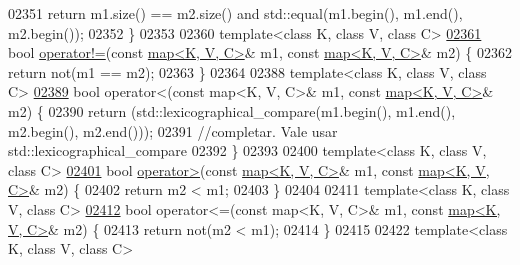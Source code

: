 \begin{DoxyCode}
02351     \textcolor{keywordflow}{return} m1.size() == m2.size() and std::equal(m1.begin(), m1.end(), m2.begin());
02352 \}
02353 
02360 \textcolor{keyword}{template}<\textcolor{keyword}{class} K, \textcolor{keyword}{class} V, \textcolor{keyword}{class} C>
\hyperlink{classaed2_1_1map_abce0fa35c5b25fd67111c2e704616f09_abce0fa35c5b25fd67111c2e704616f09}{02361} \textcolor{keywordtype}{bool} \hyperlink{classaed2_1_1map_abce0fa35c5b25fd67111c2e704616f09_abce0fa35c5b25fd67111c2e704616f09}{operator!=}(\textcolor{keyword}{const} \hyperlink{classaed2_1_1map}{map<K, V, C>}& m1, \textcolor{keyword}{const} \hyperlink{classaed2_1_1map}{map<K, V, C>}& m2) \{
02362     \textcolor{keywordflow}{return} not(m1 == m2);
02363 \}
02364 
02388 \textcolor{keyword}{template}<\textcolor{keyword}{class} K, \textcolor{keyword}{class} V, \textcolor{keyword}{class} C>
\hyperlink{classaed2_1_1map_a8ff07f6a24c290ea7e8f63ec7ab24f8d_a8ff07f6a24c290ea7e8f63ec7ab24f8d}{02389} \textcolor{keywordtype}{bool} operator<(const map<K, V, C>& m1, \textcolor{keyword}{const} \hyperlink{classaed2_1_1map}{map<K, V, C>}& m2) \{
02390     \textcolor{keywordflow}{return} (std::lexicographical\_compare(m1.begin(), m1.end(), m2.begin(), m2.end()));
02391     \textcolor{comment}{//completar.  Vale usar std::lexicographical\_compare}
02392 \}
02393 
02400 \textcolor{keyword}{template}<\textcolor{keyword}{class} K, \textcolor{keyword}{class} V, \textcolor{keyword}{class} C>
\hyperlink{classaed2_1_1map_a2000cd874b72034ce7fe730c811b6c63_a2000cd874b72034ce7fe730c811b6c63}{02401} \textcolor{keywordtype}{bool} \hyperlink{classaed2_1_1map_a2000cd874b72034ce7fe730c811b6c63_a2000cd874b72034ce7fe730c811b6c63}{operator>}(\textcolor{keyword}{const} \hyperlink{classaed2_1_1map}{map<K, V, C>}& m1, \textcolor{keyword}{const} \hyperlink{classaed2_1_1map}{map<K, V, C>}& m2) \{
02402     \textcolor{keywordflow}{return} m2 < m1;
02403 \}
02404 
02411 \textcolor{keyword}{template}<\textcolor{keyword}{class} K, \textcolor{keyword}{class} V, \textcolor{keyword}{class} C>
\hyperlink{classaed2_1_1map_afe374b37f17263d0cad3ee19a590d208_afe374b37f17263d0cad3ee19a590d208}{02412} \textcolor{keywordtype}{bool} operator<=(const map<K, V, C>& m1, \textcolor{keyword}{const} \hyperlink{classaed2_1_1map}{map<K, V, C>}& m2) \{
02413     \textcolor{keywordflow}{return} not(m2 < m1);
02414 \}
02415 
02422 \textcolor{keyword}{template}<\textcolor{keyword}{class} K, \textcolor{keyword}{class} V, \textcolor{keyword}{class} C>

\end{DoxyCode}
